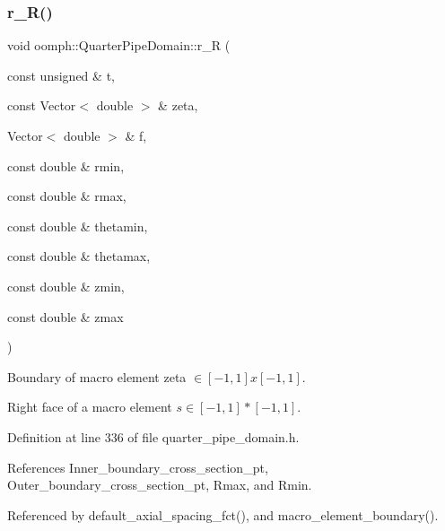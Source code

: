\subsubsection{\texorpdfstring{r\+\_\+\+R()}{r\_R()}}
{\footnotesize\ttfamily void oomph\+::\+Quarter\+Pipe\+Domain\+::r\+\_\+R (\begin{DoxyParamCaption}\item[{const unsigned \&}]{t,  }\item[{const Vector$<$ double $>$ \&}]{zeta,  }\item[{Vector$<$ double $>$ \&}]{f,  }\item[{const double \&}]{rmin,  }\item[{const double \&}]{rmax,  }\item[{const double \&}]{thetamin,  }\item[{const double \&}]{thetamax,  }\item[{const double \&}]{zmin,  }\item[{const double \&}]{zmax }\end{DoxyParamCaption})\hspace{0.3cm}{\ttfamily [private]}}



Boundary of macro element zeta $ \in [-1,1]x[-1,1] $. 

Right face of a macro element $ s \in [-1,1]*[-1,1] $. 

Definition at line 336 of file quarter\+\_\+pipe\+\_\+domain.\+h.



References Inner\+\_\+boundary\+\_\+cross\+\_\+section\+\_\+pt, Outer\+\_\+boundary\+\_\+cross\+\_\+section\+\_\+pt, Rmax, and Rmin.



Referenced by default\+\_\+axial\+\_\+spacing\+\_\+fct(), and macro\+\_\+element\+\_\+boundary().

\mbox{\label{classoomph_1_1QuarterPipeDomain_a5c023c7a9d6e43d123566bc2f7bb21f0}} 
